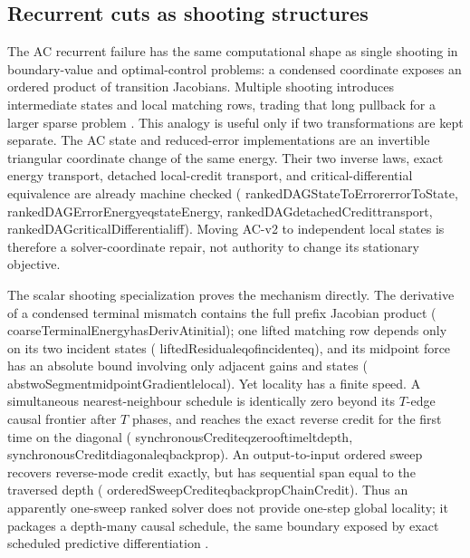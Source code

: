 \documentclass[11pt]{article}
\newcommand{\leanname}[1]{{\scriptsize\ttfamily
  \def\_{\textunderscore\allowbreak}#1}}
\begin{document}
\subsection{Recurrent cuts as shooting structures}

The AC recurrent failure has the same computational shape as single shooting in
boundary-value and optimal-control problems: a condensed coordinate exposes an ordered
product of transition Jacobians. Multiple shooting introduces intermediate states and
local matching rows, trading that long pullback for a larger sparse problem
\cite{mattheij1982shooting,bockplitt1984shooting,massaroli2021shooting,
prabhu2025shooting}. This analogy is useful only if two transformations are kept
separate. The AC state and reduced-error implementations are an invertible triangular
coordinate change of the same energy. Their two inverse laws, exact energy transport,
detached local-credit transport, and critical-differential equivalence are already
machine checked
(\leanname{rankedDAGStateToError\_errorToState},
\leanname{rankedDAGErrorEnergy\_eq\_stateEnergy},
\leanname{rankedDAG\_detachedCredit\_transport},
\leanname{rankedDAG\_criticalDifferential\_iff}). Moving AC-v2 to independent local
states is therefore a solver-coordinate repair, not authority to change its stationary
objective.

The scalar shooting specialization proves the mechanism directly. The derivative of a
condensed terminal mismatch contains the full prefix Jacobian product
(\leanname{coarseTerminalEnergy\_hasDerivAt\_initial}); one lifted matching row depends
only on its two incident states
(\leanname{liftedResidual\_eq\_of\_incident\_eq}), and its midpoint force has an
absolute bound involving only adjacent gains and states
(\leanname{abs\_twoSegment\_midpointGradient\_le\_local}). Yet locality has a finite
speed. A simultaneous nearest-neighbour schedule is identically zero beyond its
$T$-edge causal frontier after $T$ phases, and reaches the exact reverse credit for the
first time on the diagonal
(\leanname{synchronousCredit\_eq\_zero\_of\_time\_lt\_depth},
\leanname{synchronousCredit\_diagonal\_eq\_backprop}). An output-to-input ordered sweep
recovers reverse-mode credit exactly, but has sequential span equal to the traversed
depth (\leanname{orderedSweepCredit\_eq\_backpropChainCredit}). Thus an apparently
one-sweep ranked solver does not provide one-step global locality; it packages a
depth-many causal schedule, the same boundary exposed by exact scheduled predictive
differentiation \cite{salvatori2021reverse}.
\end{document}
